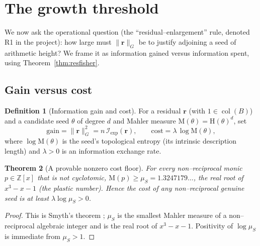 \documentclass[11pt]{article}
\theoremstyle{plain}
\newtheorem{theorem}{Theorem}[section]
\theoremstyle{definition}
\newtheorem{definition}[theorem]{Definition}
\theoremstyle{remark}
\newcommand{\Z}{\mathbb{Z}}
\newcommand{\Mah}{\mathrm{M}}
\newcommand{\height}{\mathrm{H}}
\newcommand{\Fish}{\mathcal{I}}
\newcommand{\rr}{\mathbf{r}}
\newcommand{\GG}{G}
\newcommand{\BB}{B}
\DeclareMathOperator{\col}{col}
\begin{document}
\section{The growth threshold}\label{sec:threshold}

We now ask the operational question (the ``residual--enlargement'' rule, denoted R1 in the project): how
large must $\lVert\rr\rVert_{\GG}$ be to justify adjoining a seed of arithmetic height? We frame it as
information gained versus information spent, using Theorem~\ref{thm:resfisher}.

\subsection{Gain versus cost}
\begin{definition}[Information gain and cost]\label{def:gaincost}
For a residual $\rr$ (with $1\in\col(\BB)$) and a candidate seed $\theta$ of degree $d$ and Mahler measure
$\Mah(\theta)=\height(\theta)^d$, set
\[
  \mathrm{gain}=\lVert\rr\rVert_{\GG}^2=n\,\Fish_{\mathrm{exp}}(\rr),\qquad
  \mathrm{cost}=\lambda\,\log\Mah(\theta),
\]
where $\log\Mah(\theta)$ is the seed's topological entropy \cite{LSW} (its intrinsic description length) and
$\lambda>0$ is an information exchange rate.
\end{definition}

\begin{theorem}[A provable nonzero cost floor]\label{thm:smythfloor}
For every non--reciprocal monic $p\in\Z[x]$ that is not cyclotomic, $\Mah(p)\ge\mu_S=1.3247179\ldots$, the
real root of $x^3-x-1$ (the plastic number). Hence the cost of any non--reciprocal genuine seed is at least
$\lambda\log\mu_S>0$.
\end{theorem}
\begin{proof}
This is Smyth's theorem \cite{Smyth}; $\mu_S$ is the smallest Mahler measure of a non--reciprocal algebraic
integer and is the real root of $x^3-x-1$. Positivity of $\log\mu_S$ is immediate from $\mu_S>1$.
\end{proof}
\end{document}
